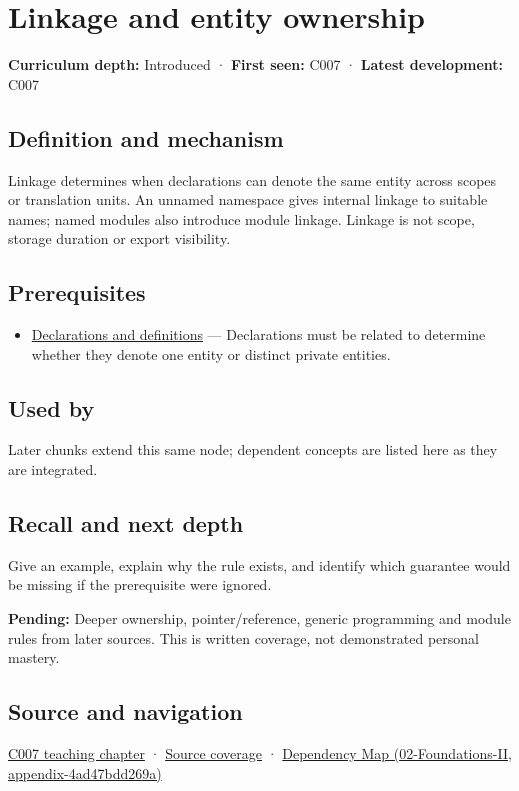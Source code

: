 \hypertarget{appendix-74a0ec818c18}{}
\section{Linkage and entity ownership}\label{appendix-74a0ec818c18-linkage-and-entity-ownership}

\textbf{Curriculum depth:} Introduced · \textbf{First seen:} C007 · \textbf{Latest development:} C007

\subsection{Definition and mechanism}\label{appendix-74a0ec818c18-definition-and-mechanism}

Linkage determines when declarations can denote the same entity across scopes or translation units. An unnamed namespace gives internal linkage to suitable names; named modules also introduce module linkage. Linkage is not scope, storage duration or export visibility.

\subsection{Prerequisites}\label{appendix-74a0ec818c18-prerequisites}

\begin{itemize}
\tightlist
\item
  \hyperref[appendix-2e4d494c2d94]{Declarations and definitions} --- Declarations must be related to determine whether they denote one entity or distinct private entities.
\end{itemize}

\subsection{Used by}\label{appendix-74a0ec818c18-used-by}

Later chunks extend this same node; dependent concepts are listed here as they are integrated.

\subsection{Recall and next depth}\label{appendix-74a0ec818c18-recall-and-next-depth}

Give an example, explain why the rule exists, and identify which guarantee would be missing if the prerequisite were ignored.

\textbf{Pending:} Deeper ownership, pointer/reference, generic programming and module rules from later sources. This is written coverage, not demonstrated personal mastery.

\subsection{Source and navigation}\label{appendix-74a0ec818c18-source-and-navigation}

\hyperref[01-foundations-i-ch002-many-files-must-describe-one-coherent-program]{C007 teaching chapter} · \hyperref[appendix-fd090d982a15-m007---parts-101-112]{Source coverage} · \href{../02-Foundations-II/main.pdf\#nameddest=appendix-4ad47bdd269a}{Dependency Map (02-Foundations-II, appendix-4ad47bdd269a)}
